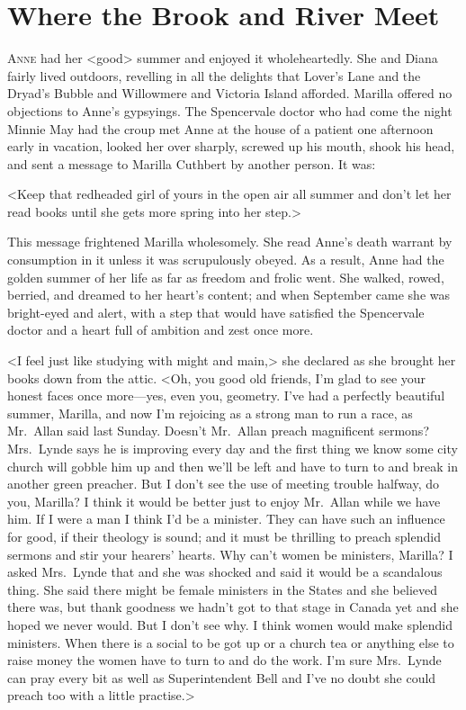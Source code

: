 \chapter{Where the Brook and River Meet}

\lettrine[]{A}{nne} had her <good> summer and enjoyed it wholeheartedly. She and Diana fairly lived outdoors, revelling in all the delights that Lover's Lane and the Dryad's Bubble and Willowmere and Victoria Island afforded. Marilla offered no objections to Anne's gypsyings. The Spencervale doctor who had come the night Minnie May had the croup met Anne at the house of a patient one afternoon early in vacation, looked her over sharply, screwed up his mouth, shook his head, and sent a message to Marilla Cuthbert by another person. It was:

<Keep that redheaded girl of yours in the open air all summer and don't let her read books until she gets more spring into her step.>

This message frightened Marilla wholesomely. She read Anne's death warrant by consumption in it unless it was scrupulously obeyed. As a result, Anne had the golden summer of her life as far as freedom and frolic went. She walked, rowed, berried, and dreamed to her heart's content; and when September came she was bright-eyed and alert, with a step that would have satisfied the Spencervale doctor and a heart full of ambition and zest once more.

<I feel just like studying with might and main,> she declared as she brought her books down from the attic. <Oh, you good old friends, I'm glad to see your honest faces once more—yes, even you, geometry. I've had a perfectly beautiful summer, Marilla, and now I'm rejoicing as a strong man to run a race, as Mr.~Allan said last Sunday. Doesn't Mr.~Allan preach magnificent sermons? Mrs.~Lynde says he is improving every day and the first thing we know some city church will gobble him up and then we'll be left and have to turn to and break in another green preacher. But I don't see the use of meeting trouble halfway, do you, Marilla? I think it would be better just to enjoy Mr.~Allan while we have him. If I were a man I think I'd be a minister. They can have such an influence for good, if their theology is sound; and it must be thrilling to preach splendid sermons and stir your hearers' hearts. Why can't women be ministers, Marilla? I asked Mrs.~Lynde that and she was shocked and said it would be a scandalous thing. She said there might be female ministers in the States and she believed there was, but thank goodness we hadn't got to that stage in Canada yet and she hoped we never would. But I don't see why. I think women would make splendid ministers. When there is a social to be got up or a church tea or anything else to raise money the women have to turn to and do the work. I'm sure Mrs.~Lynde can pray every bit as well as Superintendent Bell and I've no doubt she could preach too with a little practise.>

